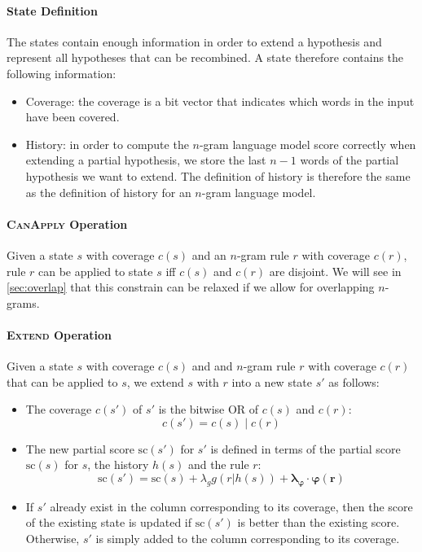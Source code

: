 \paragraph{State Definition} The states
contain enough information
in order to extend a hypothesis and represent
all hypotheses that can be recombined. A state therefore
contains the following information:
%
\begin{itemize}
  \item Coverage: the coverage is a bit vector that indicates
    which words in the input have been covered.
  \item History: in order to compute the $n$-gram language model
    score correctly when extending a partial hypothesis, we
    store the last $n-1$ words of the partial hypothesis we want
    to extend. The definition of history is therefore the same
    as the definition of history for an $n$-gram language model.
\end{itemize}

\paragraph{\textsc{CanApply} Operation}

Given a state $s$ with coverage $c(s)$ and an $n$-gram rule $r$ with
coverage $c(r)$, rule $r$ can be applied to state $s$ iff $c(s)$ and
$c(r)$ are disjoint. We will see in \autoref{sec:overlap}
that this constrain can be relaxed if we allow for overlapping
$n$-grams.

\paragraph{\textsc{Extend} Operation}

Given a state $s$ with coverage $c(s)$ and and $n$-gram rule $r$
with coverage $c(r)$ that can be applied to $s$, we extend
$s$ with $r$ into a new state $s'$ as follows:
%
\begin{itemize}
  \item The coverage $c(s')$ of $s'$ is the bitwise OR
    of $c(s)$ and $c(r)$:
%
\begin{equation}
  c(s') = c(s) \mid c(r)
\end{equation}
%
  \item The new partial score $\text{sc}(s')$ for $s'$ is defined in terms
    of the partial score $\text{sc}(s)$ for $s$, the history $h(s)$ and the rule $r$:
%
\begin{equation}
  \text{sc}(s') = \text{sc}(s) + \lambda_g g(r | h(s)) + \bm{\lambda_{\varphi}} \cdot \bm{\varphi(r)}
\end{equation}
%
  \item If $s'$ already exist in the column corresponding to its coverage, then
    the score of the existing state is updated if $\text{sc}(s')$ is better than
    the existing score. Otherwise, $s'$ is simply added to the column corresponding
    to its coverage.
\end{itemize}
%

